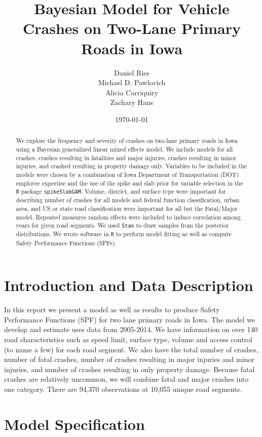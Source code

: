 \documentclass[a4paper]{article}\usepackage[]{graphicx}\usepackage[]{color}
\title{Bayesian Model for Vehicle Crashes on Two-Lane Primary Roads in Iowa}
\author{Daniel Ries \\ Michael D. Pawlovich \\ Alicia Carriquiry \\ Zachary Hans}
\date{\today}
\begin{document}
\maketitle

\begin{abstract}
We explore the frequency and severity of crashes on two-lane primary roads in Iowa using a Bayesian generalized linear mixed effects model. We include models for all crashes, crashes resulting in fatalities and major injuries, crashes resulting in minor injuries, and crashed resulting in property damage only. Variables to be included in the models were chosen by a combination of Iowa Department of Transportation (DOT) employee expertise and the use of the spike and slab prior for variable selection in the \texttt{R} package \texttt{spikeSlabGAM}. Volume, district, and surface type were important for describing number of crashes for all models and federal function classification, urban area, and US or state road classification were important for all but the Fatal/Major model. Repeated measures random effects were included to induce correlation among years for given road segments. We used \texttt{Stan} to draw samples from the posterior distributions. We wrote software in \texttt{R} to perform model fitting as well as compute Safety Performance Functions (SPFs).

\end{abstract}

\tableofcontents

\section{Introduction and Data Description}

In this report we present a model as well as results to produce Safety Performance Functions (SPF) for two lane primary roads in Iowa. The model we develop and estimate uses data from 2005-2014. We have information on over 140 road characteristics such as speed limit, surface type, volume and access control (to name a few) for each road segment. We also have the total number of crashes, number of fatal crashes, number of crashes resulting in major injuries and minor injuries, and number of crashes resulting in only property damage. Because fatal crashes are relatively uncommon, we will combine fatal and major crashes into one category. There are 94,370 observations at 10,055 unique road segments. 


\section{Model Specification}
\end{document}
